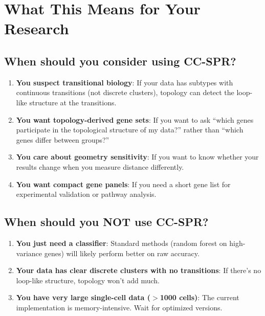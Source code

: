 \documentclass[11pt]{article}
\begin{document}
\section{What This Means for Your Research}
\label{sec:practical}

\subsection{When should you consider using CC-SPR?}

\begin{enumerate}[leftmargin=1.5em]
    \item \textbf{You suspect transitional biology}: If your data has subtypes with continuous transitions (not discrete clusters), topology can detect the loop-like structure at the transitions.
    \item \textbf{You want topology-derived gene sets}: If you want to ask ``which genes participate in the topological structure of my data?'' rather than ``which genes differ between groups?''
    \item \textbf{You care about geometry sensitivity}: If you want to know whether your results change when you measure distance differently.
    \item \textbf{You want compact gene panels}: If you need a short gene list for experimental validation or pathway analysis.
\end{enumerate}

\subsection{When should you NOT use CC-SPR?}

\begin{enumerate}[leftmargin=1.5em]
    \item \textbf{You just need a classifier}: Standard methods (random forest on high-variance genes) will likely perform better on raw accuracy.
    \item \textbf{Your data has clear discrete clusters with no transitions}: If there's no loop-like structure, topology won't add much.
    \item \textbf{You have very large single-cell data ($>$1000 cells)}: The current implementation is memory-intensive. Wait for optimized versions.
\end{enumerate}
\end{document}

